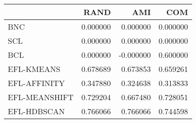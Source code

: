 \begin{tabular}{lrrr}
\toprule
 & RAND & AMI & COM \\
\midrule
BNC & 0.000000 & 0.000000 & 0.000000 \\
SCL & 0.000000 & 0.000000 & 0.000000 \\
BCL & 0.000000 & -0.000000 & 0.600000 \\
EFL-KMEANS & 0.678689 & 0.673853 & 0.659261 \\
EFL-AFFINITY & 0.347880 & 0.324638 & 0.313833 \\
EFL-MEANSHIFT & 0.729204 & 0.667480 & 0.728051 \\
EFL-HDBSCAN & 0.766066 & 0.766066 & 0.744598 \\
\bottomrule
\end{tabular}
